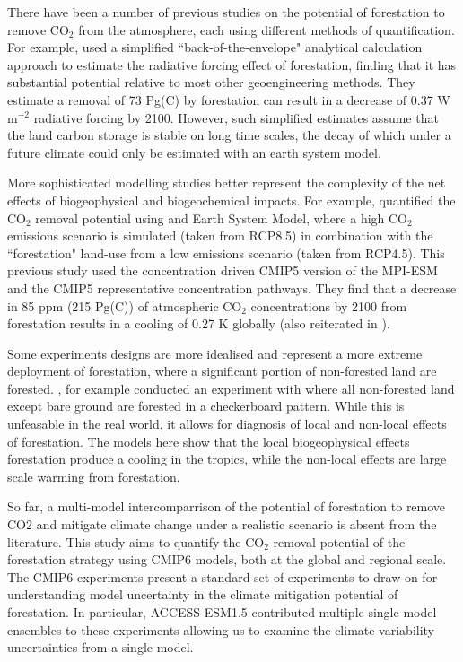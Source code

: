 \documentclass[]{article}
\begin{document}
There have been a number of previous studies on the potential of forestation to remove CO$_2$ from the atmosphere, each using different methods of quantification.
For example, \cite{lenton_radiative_2009} used a simplified ``back-of-the-envelope" analytical calculation approach to estimate the radiative forcing effect of forestation, finding that it has substantial potential relative to most other geoengineering methods.
They estimate a removal of 73 Pg(C) by forestation can result in a decrease of 0.37 W m$^{-2}$ radiative forcing by 2100.
However, such simplified estimates assume that the land carbon storage is stable on long time scales, the decay of which under a future climate could only be estimated with an earth system model.

More sophisticated modelling studies better represent the complexity of the net effects of biogeophysical and biogeochemical impacts.
For example, \cite{sonntag_reforestation_2016} quantified the CO$_2$ removal potential using and Earth System Model, where a high CO$_2$ emissions scenario is simulated (taken from RCP8.5) in combination with the ``forestation" land-use from a low emissions scenario (taken from RCP4.5).
This previous study used the concentration driven CMIP5 version of the MPI-ESM and the CMIP5 representative concentration pathways.
They find that a decrease in 85 ppm (215 Pg(C)) of atmospheric CO$_2$ concentrations by 2100 from forestation results in a cooling of 0.27 K globally (also reiterated in \cite{sonntag_quantifying_2018}).

Some experiments designs are more idealised and represent a more extreme deployment of forestation, where a significant portion of non-forested land are forested.
\cite{de_hertog_biogeophysical_2022}, for example conducted an experiment with where all non-forested land except bare ground are forested in a checkerboard pattern.
While this is unfeasable in the real world, it allows for diagnosis of local and non-local effects of forestation.
The models here show that the local biogeophysical effects forestation produce a cooling in the tropics, while the non-local effects are large scale warming from forestation. 

So far, a multi-model intercomparrison of the potential of forestation to remove CO2 and mitigate climate change under a realistic scenario is absent from the literature.
This study aims to quantify the CO$_2$ removal potential of the forestation strategy using CMIP6 models, both at the global and regional scale.
The CMIP6 experiments present a standard set of experiments to draw on for understanding model uncertainty in the climate mitigation potential of forestation.
In particular, ACCESS-ESM1.5 contributed multiple single model ensembles to these experiments allowing us to examine the climate variability uncertainties from a single model.
\end{document}
